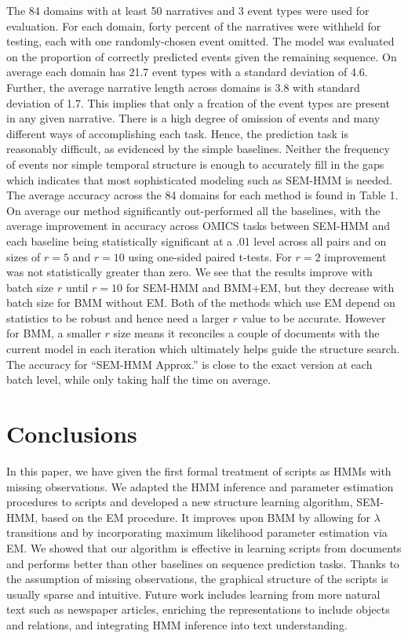 \documentclass[letterpaper]{article}
\begin{document}
The 84 domains with at least 50 narratives and 3 event types were used for evaluation.
For each domain, forty percent of the narratives were withheld for testing, each with one randomly-chosen event omitted.  The model was evaluated on the proportion of correctly predicted events given the remaining sequence.
On average each domain has 21.7 event types with a standard deviation of 4.6.  Further, the average narrative length across domains is 3.8 with standard deviation of 1.7.  This implies that
only a frcation of the event types are present in any given narrative.
There is a high degree of omission of events and many different ways of accomplishing each task.
Hence, the prediction task is reasonably difficult, as evidenced by the simple baselines.
Neither the frequency of events nor simple temporal structure is enough to accurately fill in the gaps which indicates that most sophisticated modeling such as SEM-HMM is needed.  The average accuracy across the 84 domains for each method is found in Table 1.
On average our method significantly out-performed all the baselines, with the average improvement in accuracy across OMICS tasks between SEM-HMM and each baseline being statistically significant at a .01 level across all pairs and on sizes of $r = 5$ and $r= 10$ using one-sided paired t-tests.  For $r=2$ improvement was not statistically greater than zero. %
We see that the results improve with batch size $r$ until $r=10$ for
SEM-HMM and BMM+EM, but they decrease with batch size for BMM without EM.
Both of the methods which use EM depend on statistics to be robust and hence need a larger $r$ value to be accurate.  However for BMM, a smaller $r$ size means it reconciles a couple of documents with the current model in each iteration which ultimately helps guide the structure search.
The accuracy for ``SEM-HMM Approx.'' is close to the exact version at each batch level, while only taking half the time on average.




\vspace{-3.64mm}
\section{Conclusions}

In this paper, we have given the first formal treatment of scripts as
HMMs with missing observations.
We adapted the HMM inference and parameter estimation procedures
to scripts and developed a new structure
learning algorithm, SEM-HMM, based on the EM procedure.
It improves upon BMM by allowing for $\lambda$ transitions and by
incorporating maximum likelihood parameter estimation via EM.
We showed that our algorithm is effective in learning scripts from
documents and performs better than
other baselines on sequence prediction tasks. Thanks to the
assumption of missing observations, the graphical
structure of the scripts is usually sparse and intuitive.
Future work includes learning from more natural text such as
newspaper articles, enriching the representations to include objects and
relations, and integrating HMM inference into text understanding.
\end{document}
